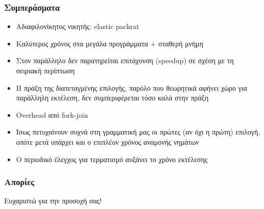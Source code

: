 \documentclass{beamer}
\begin{document}
\begin{frame}
  \frametitle{Συμπεράσματα}
  \begin{itemize}	
	\item Αδιαφιλονίκητος νικητής: elastic packrat \pause
	\item Καλύτερος χρόνος στα μεγάλα προγράμματα + σταθερή μνήμη \pause
	\item Στον παράλληλο δεν παρατηρείται επιτάχυνση (speedup) σε σχέση με τη σειριακή περίπτωση \pause
	\item H πράξη της διατεταγμένης επιλογής, παρόλο που θεωρητικά αφήνει χώρο για παράλληλη εκτέλεση, δεν συμπεριφέρεται τόσο καλά στην πράξη\pause
	\item Οverhead από fork-join\pause
	\item Ίσως πετυχαίνουν συχνά στη γραμματική μας οι πρώτες (αν όχι η πρώτη) επιλογή, οπότε μετά υπάρχει και ο επιπλέον χρόνος αναμονής νημάτων\pause
	\item Ο περιοδικό έλεγχος για τερματισμό αυξάνει το χρόνο εκτέλεσης
  \end{itemize}

\end{frame}

\begin{frame}
  \frametitle{Απορίες}
  \pause
\begin{center}
\huge Ευχαριστώ για την προσοχή σας!\footnotemark 
\end{center}
\end{frame}
\end{document}
